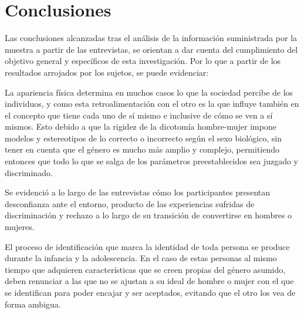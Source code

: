 \chapter{Conclusiones}\label{ch:conclusion}
%
%
%
%
%
%
%
%
%
%



Las conclusiones alcanzadas tras el análisis de la información suministrada por
la muestra a partir de las entrevistas, se orientan a dar cuenta del
cumplimiento del objetivo general y específicos de esta investigación. Por lo
que a partir de los resultados arrojados por los sujetos, se puede evidenciar:

La apariencia física determina en muchos casos lo que la sociedad percibe de los
individuos, y como esta retroalimentación con el otro es la que influye también
en el concepto que tiene cada uno de sí mismo e inclusive de cómo se ven a sí
mismos. Esto debido a que la rigidez de la dicotomía hombre-mujer impone modelos
y estereotipos de lo correcto o incorrecto según el sexo biológico, sin tener en
cuenta que el género es mucho más amplio y complejo, permitiendo entonces que
todo lo que se salga de los parámetros preestablecidos sea juzgado y
discriminado.

Se evidenció a lo largo de las entrevistas cómo los participantes presentan
desconfianza ante el entorno, producto de las experiencias sufridas de
discriminación y rechazo a lo largo de su transición de convertirse en hombres o
mujeres.

El proceso de identificación que marca la identidad de toda persona se produce
durante la infancia y la adolescencia. En el caso de estas personas al mismo
tiempo que adquieren características que se creen propias del género asumido,
deben renunciar a las que no se ajustan a su ideal de hombre o mujer con el que
se identifican para poder encajar y ser aceptados, evitando que el otro los vea
de forma ambigua.


